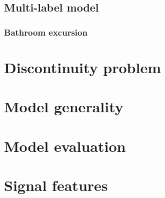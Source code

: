 \documentclass[11pt, a4paper, pdflatex, leqno, twoside, openright]{report}
\begin{document}
    \subsection{Multi-label model\label{ch:mlm}}
      \subsubsection{Bathroom excursion}

  \section{Discontinuity problem}

  \section{Model generality}

  \section{Model evaluation}

  \section{Signal features\label{sec:single:features}\label{sec:multiple:features}}

\end{document}
